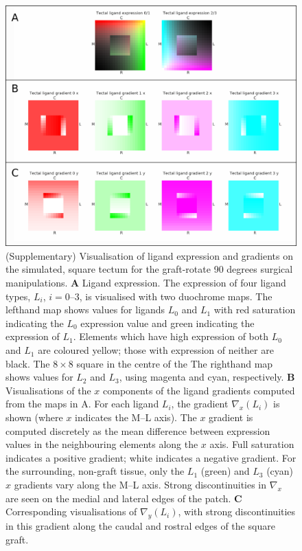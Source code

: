\documentclass[9pt,lineno,draft]{elife}
\begin{document}

\begin{figure}
\begin{fullwidth}
\includegraphics[width=0.95\linewidth]{./images/Tissuevisb.png}
\caption{(Supplementary) Visualisation of ligand expression and gradients on the simulated, square tectum for the
graft-rotate 90 degrees surgical manipulations.
\textbf{A} Ligand expression.
The expression of four ligand types, $L_i$,  $i = 0$--$3$, is visualised with two duochrome maps.
The lefthand map shows values for ligands $L_0$ and $L_1$ with red saturation indicating the $L_0$ expression value and green indicating the expression of $L_1$.
Elements which have high expression of both $L_0$ and $L_1$ are coloured yellow; those with expression of neither are black. The $8\times8$ square in the centre of the
The righthand map shows values for $L_2$ and $L_3$, using magenta and cyan, respectively.
\textbf{B} Visualisations of the $x$ components of the ligand gradients computed from the maps in A.
For each ligand $L_i$, the gradient $\nabla_x(L_i)$ is shown (where $x$ indicates the M--L axis).
The $x$ gradient is computed discretely as the mean difference between expression values in the neighbouring elements along the $x$ axis.
Full saturation indicates a positive gradient; white indicates a negative gradient.
For the surrounding, non-graft tissue, only the $L_1$ (green) and $L_3$ (cyan) $x$ gradients vary along the M--L axis.
Strong discontinuities in $\nabla_x$ are seen on the medial and lateral edges of the patch.
\textbf{C} Corresponding visualisations of $\nabla_y(L_i)$, with strong discontinuities in this gradient along the caudal and rostral edges of the square graft.}
\label{f:trot90}
\end{fullwidth}
\end{figure}
\end{document}
